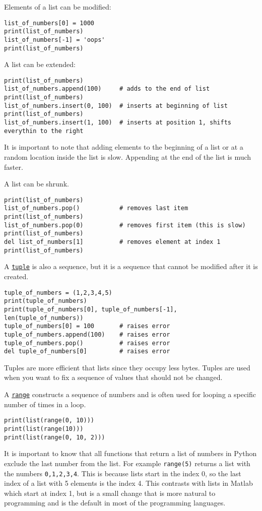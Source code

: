 \documentclass[12pt, a4paper]{article}
\begin{document}
Elements of a list can be modified:
\lstset{language=jupyter-python,label= ,caption= ,captionpos=b,numbers=none}
\begin{lstlisting}
list_of_numbers[0] = 1000
print(list_of_numbers)
list_of_numbers[-1] = 'oops'
print(list_of_numbers)
\end{lstlisting}
A list can be extended:
\lstset{language=jupyter-python,label= ,caption= ,captionpos=b,numbers=none}
\begin{lstlisting}
print(list_of_numbers)
list_of_numbers.append(100)     # adds to the end of list
print(list_of_numbers)
list_of_numbers.insert(0, 100)  # inserts at beginning of list
print(list_of_numbers)
list_of_numbers.insert(1, 100)  # inserts at position 1, shifts everythin to the right
\end{lstlisting}
It is important to note that adding elements to the beginning of a list or at a random location inside the list is slow. Appending at the end of the list is much faster.

A list can be shrunk.
\lstset{language=jupyter-python,label= ,caption= ,captionpos=b,numbers=none}
\begin{lstlisting}
print(list_of_numbers)
list_of_numbers.pop()           # removes last item
print(list_of_numbers)
list_of_numbers.pop(0)          # removes first item (this is slow)
print(list_of_numbers)
del list_of_numbers[1]          # removes element at index 1
print(list_of_numbers)
\end{lstlisting}

A \href{https://docs.python.org/3.6/library/stdtypes.html\#tuple}{\texttt{tuple}} is also a sequence, but it is a sequence that cannot be modified after it is created.
\lstset{language=jupyter-python,label= ,caption= ,captionpos=b,numbers=none}
\begin{lstlisting}
tuple_of_numbers = (1,2,3,4,5)
print(tuple_of_numbers)
print(tuple_of_numbers[0], tuple_of_numbers[-1], len(tuple_of_numbers))
tuple_of_numbers[0] = 100       # raises error
tuple_of_numbers.append(100)    # raises error
tuple_of_numbers.pop()          # raises error
del tuple_of_numbers[0]         # raises error
\end{lstlisting}
Tuples are more efficient that lists since they occupy less bytes.
Tuples are used when you want to fix a sequence of values that should not be changed.

A \href{https://docs.python.org/3.6/library/stdtypes.html\#range}{\texttt{range}} constructs a sequence of numbers and is often used for looping a specific number of times in a loop.
\lstset{language=jupyter-python,label= ,caption= ,captionpos=b,numbers=none}
\begin{lstlisting}
print(list(range(0, 10)))
print(list(range(10)))
print(list(range(0, 10, 2)))
\end{lstlisting}
It is important to know that all functions that return a list of numbers in Python exclude the last number from the list. For example \texttt{range(5)} returns a list with the numbers \texttt{0,1,2,3,4}. This is because lists start in the index 0, so the last index of a list with 5 elements is the index 4.
This contrasts with lists in Matlab which start at index 1, but is a small change that is more natural to programming and is the default in most of the programming languages.
\end{document}

